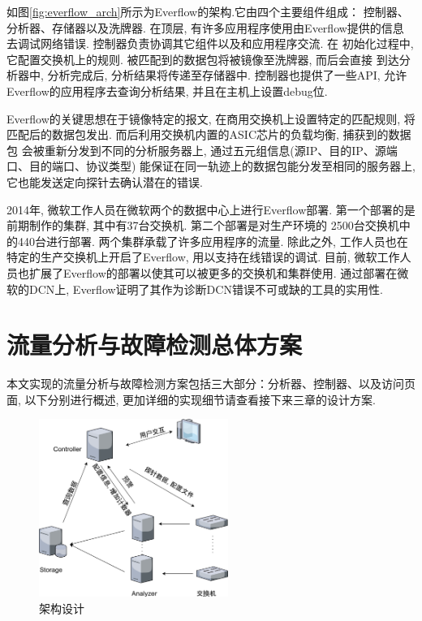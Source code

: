   如图\ref{fig:everflow_arch}所示为Everflow的架构.它由四个主要组件组成：
控制器、分析器、存储器以及洗牌器. 在顶层, 有许多应用程序使用由Everflow提供的信息
去调试网络错误. 控制器负责协调其它组件以及和应用程序交流. 在
初始化过程中, 它配置交换机上的规则. 被匹配到的数据包将被镜像至洗牌器, 而后会直接
到达分析器中, 分析完成后, 分析结果将传递至存储器中.
控制器也提供了一些API, 允许Everflow的应用程序去查询分析结果, 并且在主机上设置debug位.

  Everflow的关键思想在于镜像特定的报文, 在商用交换机上设置特定的匹配规则, 将匹配后的数据包发出.
而后利用交换机内置的ASIC芯片的负载均衡, 捕获到的数据包
会被重新分发到不同的分析服务器上, 通过五元组信息(源IP、目的IP、源端口、目的端口、协议类型)
能保证在同一轨迹上的数据包能分发至相同的服务器上,
它也能发送定向探针去确认潜在的错误.

  2014年, 微软工作人员在微软两个的数据中心上进行Everflow部署.
第一个部署的是前期制作的集群, 其中有37台交换机. 第二个部署是对生产环境的
2500台交换机中的440台进行部署. 两个集群承载了许多应用程序的流量.
除此之外, 工作人员也在特定的生产交换机上开启了Everflow, 用以支持在线错误的调试.
目前, 微软工作人员也扩展了Everflow的部署以使其可以被更多的交换机和集群使用.
通过部署在微软的DCN上, Everflow证明了其作为诊断DCN错误不可或缺的工具的实用性.

\chapter{流量分析与故障检测总体方案}

本文实现的流量分析与故障检测方案包括三大部分：分析器、控制器、以及访问页面, 以下分别进行概述,
更加详细的实现细节请查看接下来三章的设计方案.

\begin{figure}
  \centering
  \includegraphics[width=0.55\textwidth]{../img/user_flow.png}
  \caption{架构设计}
  \label{fig:arch}
\end{figure}

